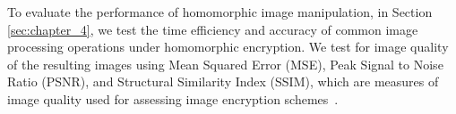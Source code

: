 To evaluate the performance of homomorphic image manipulation, in Section \ref{sec:chapter_4}, we test the time efficiency and accuracy of common image processing operations under homomorphic encryption. We test for image quality of the resulting images using Mean Squared Error (MSE), Peak Signal to Noise Ratio (PSNR), and Structural Similarity Index (SSIM), which are measures of image quality used for assessing image encryption schemes~\cite{ahmed_benchmark_2016}.





